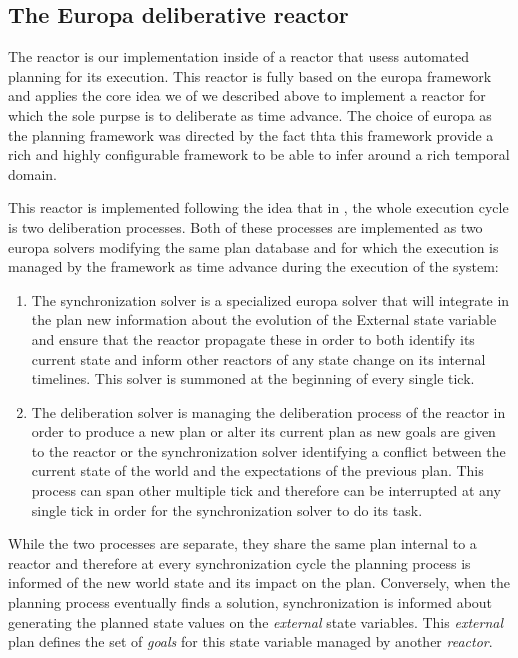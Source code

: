 \subsection{The Europa deliberative reactor}
\label{sec:arch:europa}

The \eu reactor is our implementation inside \rx of a reactor that
usess automated planning for its execution. This reactor is fully
based on the europa framework and applies the core idea we of \rx we
described above to implement a reactor for which the sole purpse is to
deliberate as time advance. The choice of europa as the planning
framework was directed by the fact thta this framework provide a rich
and highly configurable framework to be able to infer around a rich
temporal domain.

This reactor is implemented following the idea that in \rx, the
whole execution cycle is two deliberation processes. Both of these
processes are implemented as two europa solvers modifying the same
plan database and for which the execution is managed by the \rx 
framework as time advance during the execution of the system:

\begin{enumerate}

\item The synchronization solver is a specialized europa solver that
  will integrate in the plan new information about the evolution of
  the External state variable and ensure that the reactor propagate
  these in order to both identify its current state and inform
  other reactors of any state change on its internal timelines. This
  solver is summoned at the beginning of every single tick.

\item The deliberation solver is managing the deliberation process of
  the reactor in order to produce a new plan or alter its current plan
  as new goals are given to the reactor or the synchronization solver
  identifying a conflict between the current state of the world and
  the expectations of the previous plan. This process can  span other
  multiple tick and therefore can be interrupted at any single tick in
  order for the synchronization solver to do its task.

\end{enumerate}

While the two processes are separate, they share the same plan
internal to a reactor and therefore at every synchronization cycle the
planning process is informed of the new world state and its impact on
the plan. Conversely, when the planning process eventually finds a
solution, synchronization is informed about generating the planned
state values on the {\em external} state variables. This {\em
  external} plan defines the set of {\em goals} for this state
variable managed by another {\em reactor}.

